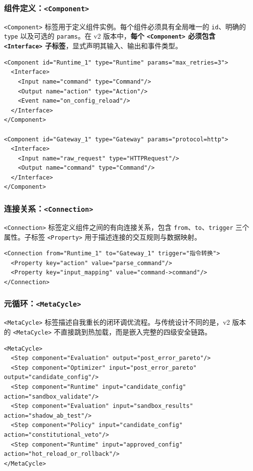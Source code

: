 \subsubsection{组件定义：\texttt{<Component>}}

\texttt{<Component>} 标签用于定义组件实例。每个组件必须具有全局唯一的 \texttt{id}、明确的 \texttt{type} 以及可选的 \texttt{params}。在 v2 版本中，\textbf{每个 \texttt{<Component>} 必须包含 \texttt{<Interface>} 子标签}，显式声明其输入、输出和事件类型。

\begin{lstlisting}[caption={带接口契约的组件定义示例}, label={lst:component}]
<Component id="Runtime_1" type="Runtime" params="max_retries=3">
  <Interface>
    <Input name="command" type="Command"/>
    <Output name="action" type="Action"/>
    <Event name="on_config_reload"/>
  </Interface>
</Component>

<Component id="Gateway_1" type="Gateway" params="protocol=http">
  <Interface>
    <Input name="raw_request" type="HTTPRequest"/>
    <Output name="command" type="Command"/>
  </Interface>
</Component>
\end{lstlisting}

\subsubsection{连接关系：\texttt{<Connection>}}

\texttt{<Connection>} 标签定义组件之间的有向连接关系，包含 \texttt{from}、\texttt{to}、\texttt{trigger} 三个属性。子标签 \texttt{<Property>} 用于描述连接的交互规则与数据映射。

\begin{lstlisting}[caption={连接关系定义示例}, label={lst:connection}]
<Connection from="Runtime_1" to="Gateway_1" trigger="指令转换">
  <Property key="action" value="parse_command"/>
  <Property key="input_mapping" value="command->command"/>
</Connection>
\end{lstlisting}

\subsubsection{元循环：\texttt{<MetaCycle>}}

\texttt{<MetaCycle>} 标签描述自我重长的闭环调优流程。与传统设计不同的是，v2 版本的 \texttt{<MetaCycle>} 不直接跳到热加载，而是嵌入完整的四级安全链路。

\begin{lstlisting}[caption={带安全链路的 MetaCycle 示例}, label={lst:metacycle}]
<MetaCycle>
  <Step component="Evaluation" output="post_error_pareto"/>
  <Step component="Optimizer" input="post_error_pareto" output="candidate_config"/>
  <Step component="Runtime" input="candidate_config" action="sandbox_validate"/>
  <Step component="Evaluation" input="sandbox_results" action="shadow_ab_test"/>
  <Step component="Policy" input="candidate_config" action="constitutional_veto"/>
  <Step component="Runtime" input="approved_config" action="hot_reload_or_rollback"/>
</MetaCycle>
\end{lstlisting}

